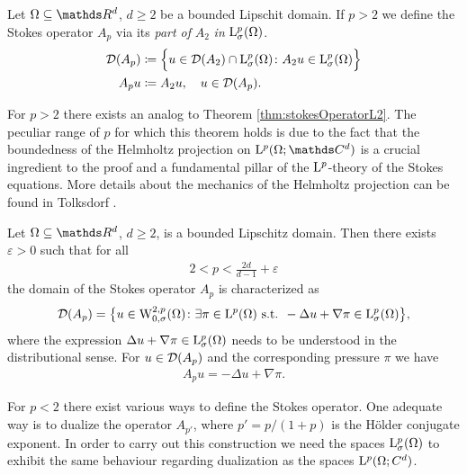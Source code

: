 \begin{defn}
  \label{defn:stokeslp}
  Let $\Omega\subseteq \R^d$, $d \geq 2$ be a bounded Lipschit domain.
  If $p > 2$ we define the Stokes operator $A_p$ via its \emph{part of} $A_2$ \emph{in } $\mathrm{L}^p_\sigma(\Omega)$.
  \begin{align*}
    \mathcal{D}(A_p) &\coloneqq \Big\{ u \in \mathcal{D}(A_2) \cap \mathrm{L}^p_\sigma(\Omega) \colon A_2 u \in \mathrm{L}^p_\sigma(\Omega) \Big\} \\
    A_p u &\coloneqq A_2 u, \quad u \in \mathcal{D}(A_p).
  \end{align*}
\end{defn}

For $p > 2$ there exists an analog to Theorem \ref{thm:stokesOperatorL2}. The peculiar range of $p$ for which this theorem holds is due to the fact that the boundedness of the Helmholtz projection on $\Ell^p(\Omega; \C^d)$ is a crucial ingredient to the proof and a fundamental pillar of the $\mathrm{L}^p$-theory of the Stokes equations.
More details about the mechanics of the Helmholtz projection can be found in Tolksdorf \cite[Sec. 5.1]{tolksdorf}.

\begin{thm}
  \label{thm:domainStokesOperatorLp}
  Let $\Omega \subseteq \R^d$, $d \geq 2$, is a bounded Lipschitz domain.
  Then there exists $\varepsilon > 0$ such that for all
  \begin{align*}
    2 < p < \frac{2d}{d - 1} + \varepsilon
  \end{align*}
  the domain of the Stokes operator $A_p$ is characterized as
  \begin{align*}
    \mathcal{D}(A_p) = \big\{ u \in \mathrm{W}^{2,p}_{0,\sigma}(\Omega) \colon \exists \pi \in \mathrm{L}^p(\Omega) \text{ s.t. } -\Delta u + \nabla \pi \in \mathrm{L}^p_\sigma(\Omega) \big\},
  \end{align*}
  where the expression $\Delta u + \nabla \pi \in\mathrm{L}^p_\sigma(\Omega)$ needs to be understood in the distributional sense.
  For $u \in \mathcal{D}(A_p)$ and the corresponding pressure $\pi$ we have
  \begin{align*}
    A_p u = -\Delta u + \nabla \pi.
  \end{align*}
\end{thm}

For $p < 2$ there exist various ways to define the Stokes operator.
One adequate way is to dualize the operator $A_{p'}$, where $p' = p / (1 + p)$ is the Hölder conjugate exponent.
In order to carry out this construction we need the spaces $\mathrm{L}^p_\sigma(\Omega)$ to exhibit the same behaviour regarding dualization as the spaces $\mathrm{L}^p(\Omega; C^d)$.

